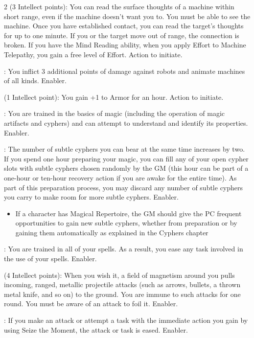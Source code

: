 \begin{multicols}{2}
 (3 Intellect points): You can read the surface thoughts of a machine within short range, even if the machine doesn’t want you to. You must be able to see the machine. Once you have established contact, you can read the target’s thoughts for up to one minute. If you or the target move out of range, the connection is broken. If you have the Mind Reading ability, when you apply Effort to Machine Telepathy, you gain a free level of Effort. Action to initiate. 
 
: You inflict 3 additional points of damage against robots and animate machines of all kinds. Enabler. 
 
 (1 Intellect point): You gain +1 to Armor for an hour. Action to initiate. 
 
: You are trained in the basics of magic (including the operation of magic artifacts and cyphers) and can attempt to understand and identify its properties. Enabler. 

: The number of subtle cyphers you can bear at the same time increases by two. If you spend one hour preparing your magic, you can fill any of your open cypher slots with subtle cyphers chosen randomly by the GM (this hour can be part of a one-hour or ten-hour recovery action if you are awake for the entire time). As part of this preparation process, you may discard any number of subtle cyphers you carry to make room for more subtle cyphers. Enabler.

\begin{itemize} 
\item If a character has Magical Repertoire, the GM should give the PC frequent opportunities to gain new subtle cyphers, whether from preparation or by gaining them automatically as explained in the Cyphers chapter
\end{itemize} 

: You are trained in all of your spells. As a result, you ease any task involved in the use of your spells. Enabler.

 (4 Intellect points): When you wish it, a field of magnetism around you pulls incoming, ranged, metallic projectile attacks (such as arrows, bullets, a thrown metal knife, and so on) to the ground. You are immune to such attacks for one round. You must be aware of an attack to foil it. Enabler. 
 
: If you make an attack or attempt a task with the immediate action you gain by using Seize the Moment, the attack or task is eased. Enabler. 
 

\end{multicols}

